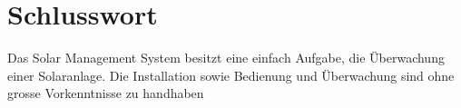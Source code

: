 \section{Schlusswort}
Das Solar Management System besitzt eine einfach Aufgabe, die Überwachung einer Solaranlage. Die Installation sowie Bedienung und Überwachung sind ohne grosse Vorkenntnisse zu handhaben